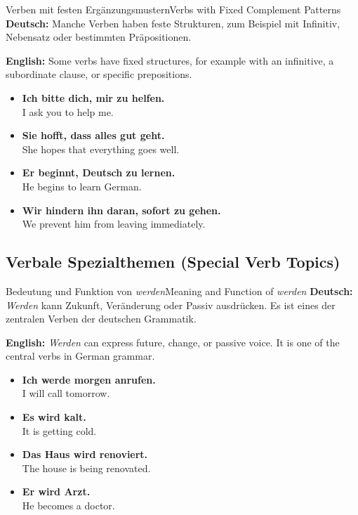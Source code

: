 \documentclass[a4paper,11pt]{article}
\newcommand{\GermanText}[1]{\textbf{Deutsch: }#1\par}
\newcommand{\EnglishText}[1]{{\color{SoftGray}\textbf{English: }#1\par}}
\newcommand{\ExampleItem}[2]{\item \textbf{#1}\\{\color{SoftGray}#2}}
\begin{document}
\begin{grammarentry}{Verben mit festen Ergänzungsmustern}{Verbs with Fixed Complement Patterns}
    \GermanText{Manche Verben haben feste Strukturen, zum Beispiel mit Infinitiv, Nebensatz oder bestimmten Präpositionen.}
    \EnglishText{Some verbs have fixed structures, for example with an infinitive, a subordinate clause, or specific prepositions.}
    \begin{exbox}
        \begin{itemize}
            \ExampleItem{Ich bitte dich, mir zu helfen.}{I ask you to help me.}
            \ExampleItem{Sie hofft, dass alles gut geht.}{She hopes that everything goes well.}
            \ExampleItem{Er beginnt, Deutsch zu lernen.}{He begins to learn German.}
            \ExampleItem{Wir hindern ihn daran, sofort zu gehen.}{We prevent him from leaving immediately.}
        \end{itemize}
    \end{exbox}
\end{grammarentry}

\subsection{Verbale Spezialthemen {\small (Special Verb Topics)}}

\begin{grammarentry}{Bedeutung und Funktion von \textit{werden}}{Meaning and Function of \textit{werden}}
    \GermanText{\textit{Werden} kann Zukunft, Veränderung oder Passiv ausdrücken. Es ist eines der zentralen Verben der deutschen Grammatik.}
    \EnglishText{\textit{Werden} can express future, change, or passive voice. It is one of the central verbs in German grammar.}
    \begin{exbox}
        \begin{itemize}
            \ExampleItem{Ich werde morgen anrufen.}{I will call tomorrow.}
            \ExampleItem{Es wird kalt.}{It is getting cold.}
            \ExampleItem{Das Haus wird renoviert.}{The house is being renovated.}
            \ExampleItem{Er wird Arzt.}{He becomes a doctor.}
        \end{itemize}
    \end{exbox}
\end{grammarentry}
\end{document}
